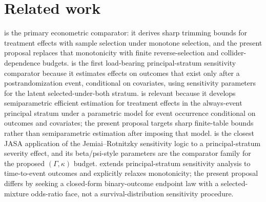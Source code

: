 \documentclass[11pt]{article}
\theoremstyle{definition}
\theoremstyle{plain}
\theoremstyle{remark}
\begin{document}
\section{Related work}
\citet{Lee2009SampleSelection} is the primary econometric comparator: it derives sharp trimming bounds for treatment effects with sample selection under monotone selection, and the present proposal replaces that monotonicity with finite reverse-selection and collider-dependence budgets.  \citet{ShepherdGilbertJemiaiRotnitzky2006} is the first load-bearing principal-stratum sensitivity comparator because it estimates effects on outcomes that exist only after a postrandomization event, conditional on covariates, using sensitivity parameters for the latent selected-under-both stratum.  \citet{JemiaiRotnitzkyShepherdGilbert2007} is relevant because it develops semiparametric efficient estimation for treatment effects in the always-event principal stratum under a parametric model for event occurrence conditional on outcomes and covariates; the present proposal targets sharp finite-table bounds rather than semiparametric estimation after imposing that model.  \citet{ShepherdRedmanAnkerst2008} is the closest JASA application of the Jemiai--Rotnitzky sensitivity logic to a principal-stratum severity effect, and its beta/psi-style parameters are the comparator family for the proposed \((\Gamma,\kappa)\) budget.  \citet{ShepherdGilbertDupont2011} extends principal-stratum sensitivity analysis to time-to-event outcomes and explicitly relaxes monotonicity; the present proposal differs by seeking a closed-form binary-outcome endpoint law with a selected-mixture odds-ratio face, not a survival-distribution sensitivity procedure.
\end{document}
